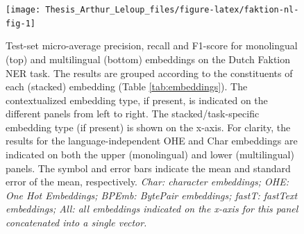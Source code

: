 \documentclass[12pt,a4paper,]{book}
\begin{document}
\begin{figure}

{\centering \texttt{[image: Thesis\_Arthur\_Leloup\_files/figure-latex/faktion-nl-fig-1]} 

}

\caption{Test-set micro-average precision, recall and F1-score for monolingual (top) and multilingual (bottom) embeddings on the Dutch Faktion NER task. The results are grouped according to the constituents of each (stacked) embedding (Table \ref{tab:embeddings}). The contextualized embedding type, if present, is indicated on the different panels from left to right. The stacked/task-specific embedding type (if present) is shown on the x-axis. For clarity, the results for the language-independent OHE and Char embeddings are indicated on both the upper (monolingual) and lower (multilingual) panels. The symbol and error bars indicate the mean and standard error of the mean, respectively. \emph{Char: character embeddings; OHE: One Hot Embeddings; BPEmb: BytePair embeddings; fastT: fastText embeddings; All: all embeddings indicated on the x-axis for this panel concatenated into a single vector.}}\label{fig:faktion-nl-fig}
\end{figure}
\end{document}
